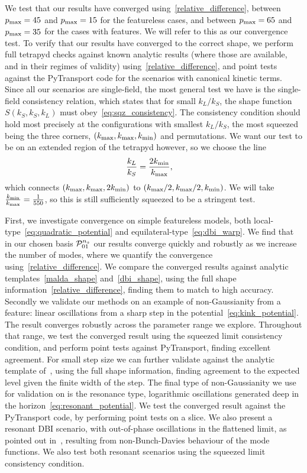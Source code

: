 We test that our results have converged using~\eqref{relative_difference},
between $p_\text{max}=45$ and $p_\text{max}=15$ for the featureless cases,
and between $p_\text{max}=65$ and $p_\text{max}=35$ for the cases with features.
We will refer to this as our convergence test.
To verify that our results have converged to the correct shape,
we perform full tetrapyd checks against known analytic results
(where those are available, and in their regimes of validity)
using~\eqref{relative_difference},
and point tests against the PyTransport code for the scenarios
with canonical kinetic terms.
Since all our scenarios are single-field, the most general
test we have is the single-field consistency relation,
which states that for small $k_L/k_S$, the shape function $S(k_S,k_S,k_L)$
must obey~\eqref{eq:sqz_consistency}.
The consistency condition should hold most precisely
at the configurations with smallest $k_L/k_S$,
the most squeezed being the three corners, $({k_\text{max}},{k_\text{max}},{k_\text{min}})$ and permutations.
We want our test to be on an extended region of the tetrapyd however,
so we choose the line
\begin{align}\label{sqz_line}
    \frac{k_L}{k_S}&=\frac{2{k_\text{min}}}{{k_\text{max}}},
\end{align}
which connects $({k_\text{max}},{k_\text{max}},2{k_\text{min}})$ to $({k_\text{max}}/2,{k_\text{max}}/2,{k_\text{min}})$.
We will take $\frac{{k_\text{min}}}{{k_\text{max}}}=\frac{1}{550}$, so this is still sufficiently squeezed to be a stringent test.

First, we investigate convergence on simple featureless models,
both local-type~\eqref{eq:quadratic_potential}
and equilateral-type~\eqref{eq:dbi_warp}.
We find that in our chosen basis $\mathcal{P}^{n_s}_{01}$ our results
converge quickly and robustly as we increase the number of modes,
where we quantify the convergence using~\eqref{relative_difference}.
We compare the converged results against analytic
templates~\eqref{malda_shape} and~\eqref{dbi_shape},
using the full shape information~\eqref{relative_difference},
finding them to match to high accuracy.
Secondly we validate our methods on an example of non-Gaussianity
from a feature: linear oscillations from a sharp step in the
potential~\eqref{eq:kink_potential}. The result converges robustly
across the parameter range we explore. Throughout that range,
we test the converged result using the squeezed limit consistency
condition, and perform point tests against PyTransport,
finding excellent agreement.
For small step size we can further validate against the analytic template
of~\cite{adshead}, using the full shape information, finding agreement
to the expected level given the finite width of the step.
The final type of non-Gaussianity we use for validation on is the resonance
type, logarithmic oscillations generated deep in the horizon~\eqref{eq:resonant_potential}.
We test the converged result against the PyTransport
code, by performing point tests on a slice.
We also present a resonant DBI scenario, with out-of-phase oscillations
in the flattened limit, as pointed out in~\cite{chen_folded_resonant},
resulting from non-Bunch-Davies behaviour of the mode functions.
We also test both resonant scenarios using the squeezed limit consistency condition.


